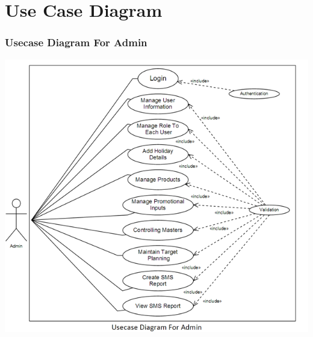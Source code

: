 \section{Use Case Diagram}
\subsubsection{Usecase Diagram For Admin}
\includegraphics[scale=0.7]{Diag/usecaseadmin.png}

\label{fig:Use case diagram For Admin}
